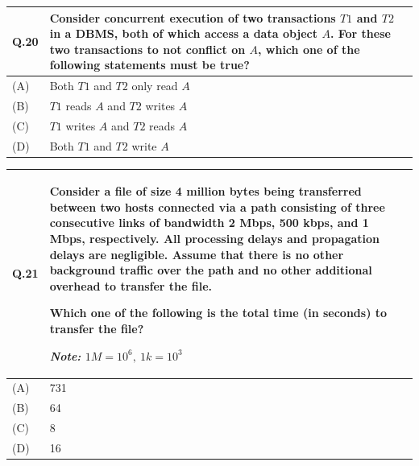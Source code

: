 \documentclass[14pt]{article}
\begin{document}
\vspace{0.5cm}

\begin{tabular}{|p{1.2cm}|p{12cm}|}
\hline

\textbf{Q.20} &
Consider concurrent execution of two transactions $T1$ and $T2$ in a DBMS, both of which access a data object $A$. For these two transactions to not conflict on $A$, which one of the following statements must be true?
\\

\hline

(A) & Both $T1$ and $T2$ only read $A$ \\
\hline

(B) & $T1$ reads $A$ and $T2$ writes $A$ \\
\hline

(C) & $T1$ writes $A$ and $T2$ reads $A$ \\
\hline

(D) & Both $T1$ and $T2$ write $A$ \\
\hline

\end{tabular}

\newpage

\begin{tabular}{|p{1.5cm}|p{12cm}|}
\hline

Q.21 &
\parbox[t]{\linewidth}{
Consider a file of size 4 million bytes being transferred between two hosts connected via a path consisting of three consecutive links of bandwidth 2 Mbps, 500 kbps, and 1 Mbps, respectively. All processing delays and propagation delays are negligible. Assume that there is no other background traffic over the path and no other additional overhead to transfer the file.

\vspace{0.2cm}

Which one of the following is the total time (in seconds) to transfer the file?

\vspace{0.2cm}

\textit{Note:} $1M=10^6,\ 1k=10^3$
}
\\
\hline

(A) & 731 \\
\hline
(B) & 64 \\
\hline
(C) & 8 \\
\hline
(D) & 16 \\
\hline

\end{tabular}
\end{document}
